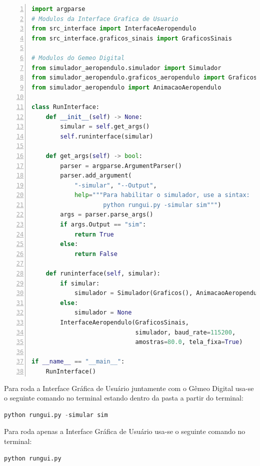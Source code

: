 \begin{lstlisting}[language=python, numbers=left, label=py2, caption={Código que execulta a Interface Gráfica e o Gêmeo Digital.}]
import argparse
# Modulos da Interface Grafica de Usuario
from src_interface import InterfaceAeropendulo
from src_interface.graficos_sinais import GraficosSinais

# Modulos do Gemeo Digital
from simulador_aeropendulo.simulador import Simulador
from simulador_aeropendulo.graficos_aeropendulo import Graficos
from simulador_aeropendulo import AnimacaoAeropendulo

class RunInterface:
    def __init__(self) -> None:
        simular = self.get_args()
        self.runinterface(simular)

    def get_args(self) -> bool:
        parser = argparse.ArgumentParser()
        parser.add_argument(
            "-simular", "--Output",
            help="""Para habilitar o simulador, use a sintax:
                    python rungui.py -simular sim""")
        args = parser.parse_args()
        if args.Output == "sim":
            return True
        else:
            return False

    def runinterface(self, simular):
        if simular:
            simulador = Simulador(Graficos(), AnimacaoAeropendulo())
        else:
            simulador = None
        InterfaceAeropendulo(GraficosSinais,
                             simulador, baud_rate=115200,
                             amostras=80.0, tela_fixa=True)

if __name__ == "__main__":
    RunInterface()

\end{lstlisting}


Para roda a Interface Gráfica de Usuário juntamente com o Gêmeo Digital usa-se o seguinte comando no terminal estando dentro da pasta a partir do terminal:

\vspace{0.5cm}

\begin{lstlisting}[language=python]
python rungui.py -simular sim
\end{lstlisting}

Para roda apenas a Interface Gráfica de Usuário usa-se o seguinte comando no terminal:

\vspace{0.5cm}

\begin{lstlisting}[language=python]
python rungui.py
\end{lstlisting}



